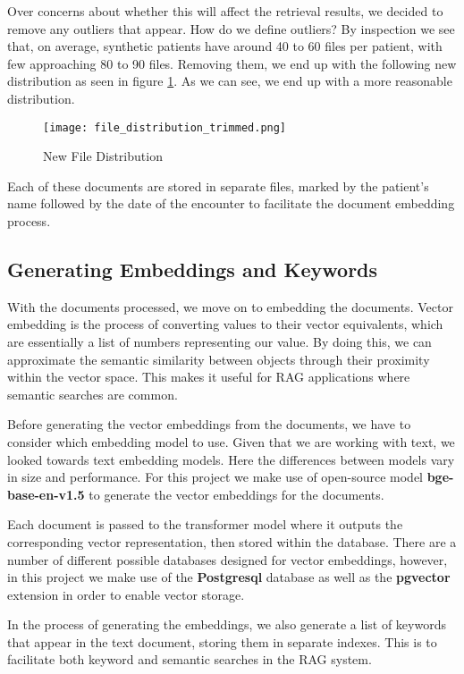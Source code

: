 Over concerns about whether this will affect the retrieval results, we decided to remove any outliers that appear. How do we define outliers? By inspection we see that, on average, synthetic patients have around 40 to 60 files per patient, with few approaching 80 to 90 files.
Removing them, we end up with the following new distribution as seen in figure \ref{fig:FileDistributionAfter}. As we can see, we end up with a more reasonable distribution.

\begin{figure}[h]
	\centering
	\texttt{[image: file\_distribution\_trimmed.png]}
	\caption{New File Distribution}
	\label{fig:FileDistributionAfter}
\end{figure}

Each of these documents are stored in separate files, marked by the patient's name followed by the date of the encounter to facilitate the document embedding process.

\subsection{Generating Embeddings and Keywords}

With the documents processed, we move on to embedding the documents. Vector embedding is the process of converting values to their vector equivalents, which are essentially a list of numbers representing our value.
By doing this, we can approximate the semantic similarity between objects through their proximity within the vector space. This makes it useful for RAG applications where semantic searches are common.

Before generating the vector embeddings from the documents, we have to consider which embedding model to use. Given that we are working with text, we looked towards text embedding models. Here the differences between models vary in size and performance. For this project we make use of open-source model \textbf{bge-base-en-v1.5} to generate the vector embeddings for the documents.

Each document is passed to the transformer model where it outputs the corresponding vector representation, then stored within the database. There are a number of different possible databases designed for vector embeddings, however, in this project we make use of the \textbf{Postgresql} database as well as the \textbf{pgvector} extension in order to enable vector storage.

In the process of generating the embeddings, we also generate a list of keywords that appear in the text document, storing them in separate indexes. This is to facilitate both keyword and semantic searches in the RAG system.

